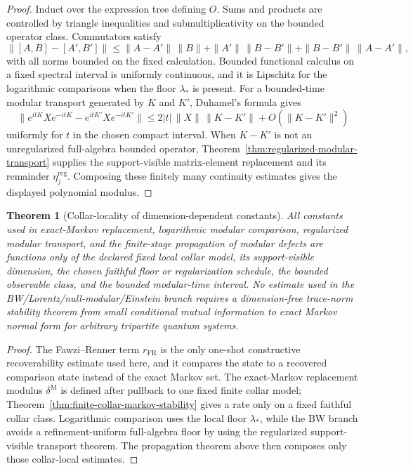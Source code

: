 \documentclass[11pt]{article}
\newtheorem{theorem}{Theorem}[section]
\begin{document}
\begin{proof}
Induct over the expression tree defining \(O\). Sums and products are
controlled by triangle inequalities and submultiplicativity on the bounded
operator class. Commutators satisfy
\[
\|[A,B]-[A',B']\|
\le
\|A-A'\|\,\|B\|+\|A'\|\,\|B-B'\|
+\|B-B'\|\,\|A-A'\|,
\]
with all norms bounded on the fixed calculation. Bounded functional calculus
on a fixed spectral interval is uniformly continuous, and it is Lipschitz for
the logarithmic comparisons when the floor \(\lambda_\ast\) is present. For a
bounded-time modular transport generated by \(K\) and \(K'\), Duhamel's formula
gives
\[
\|e^{itK}Xe^{-itK}-e^{itK'}Xe^{-itK'}\|
\le
2|t|\,\|X\|\,\|K-K'\|+O(\|K-K'\|^2)
\]
uniformly for \(t\) in the chosen compact interval. When \(K-K'\) is not an
unregularized full-algebra bounded operator, Theorem~\ref{thm:regularized-modular-transport}
supplies the support-visible matrix-element replacement and its remainder
\(\eta^{\mathrm{reg}}_j\). Composing these finitely many continuity estimates
gives the displayed polynomial modulus.
\end{proof}

\begin{theorem}[Collar-locality of dimension-dependent constants]\label{thm:dimension-quarantine}
All constants used in exact-Markov replacement, logarithmic modular
comparison, regularized modular transport, and the finite-stage propagation of
modular defects are functions only of the declared fixed local collar model,
its support-visible dimension, the chosen faithful floor or regularization
schedule, the bounded observable class, and the bounded modular-time interval.
No estimate used in the BW/Lorentz/null-modular/Einstein branch requires a
dimension-free trace-norm stability theorem from small conditional mutual
information to exact Markov normal form for arbitrary tripartite quantum
systems.
\end{theorem}

\begin{proof}
The Fawzi--Renner term \(r_{\mathrm{FR}}\) is the only one-shot constructive
recoverability estimate used here, and it compares the state to a recovered
comparison state instead of the exact Markov set. The exact-Markov
replacement modulus \(\delta^{\mathrm M}\) is defined after pullback to one
fixed finite collar model; Theorem~\ref{thm:finite-collar-markov-stability}
gives a rate only on a fixed faithful collar class. Logarithmic comparison uses
the local floor \(\lambda_\ast\), while the BW branch avoids a refinement-uniform
full-algebra floor by using the regularized support-visible transport theorem.
The propagation theorem above then composes only those collar-local estimates.
\end{proof}
\end{document}
